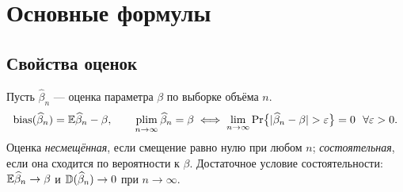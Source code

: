 %
%
%
%
%


\ifsolutions
\section{Основные формулы}

\subsection{Свойства оценок}\label{sec:props}

Пусть $\widehat{\beta}_n$ — оценка параметра $\beta$ по выборке объёма $n$.
\begin{equation}
  \operatorname{bias}(\widehat{\beta}_n) = \mathbb{E}\widehat{\beta}_n - \beta,
  \qquad
  \operatorname*{plim}_{n\to\infty}\widehat{\beta}_n = \beta
  \iff
  \lim_{n\to\infty}\Pr\bigl\{|\widehat{\beta}_n - \beta| > \varepsilon\bigr\} = 0
  \ \ \forall\varepsilon > 0 .
  \label{eq:bias}
\end{equation}
Оценка \emph{несмещённая}, если смещение равно нулю при любом $n$;
\emph{состоятельная}, если она сходится по вероятности к $\beta$.
Достаточное условие состоятельности: $\mathbb{E}\widehat{\beta}_n \to \beta$ и
$\mathbb{D}(\widehat{\beta}_n) \to 0$ при $n \to \infty$.

